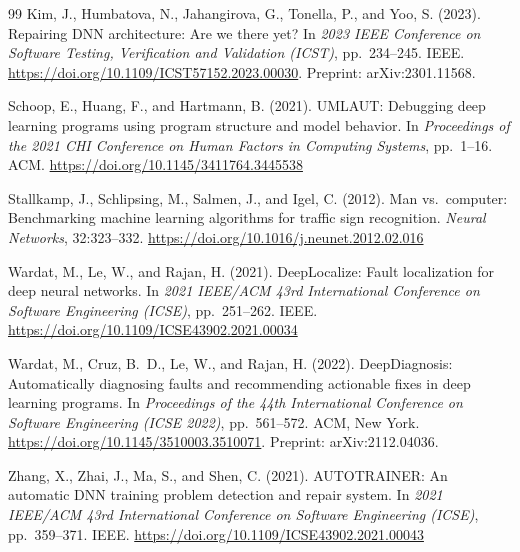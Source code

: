 \documentclass[11pt]{article}
\begin{document}
\begin{thebibliography}{99}
Kim, J., Humbatova, N., Jahangirova, G., Tonella, P., and Yoo, S. (2023).
\newblock Repairing DNN architecture: Are we there yet?
\newblock In \emph{2023 IEEE Conference on Software Testing, Verification and Validation (ICST)}, pp.~234--245. IEEE.
\newblock \url{https://doi.org/10.1109/ICST57152.2023.00030}. Preprint: arXiv:2301.11568.

Schoop, E., Huang, F., and Hartmann, B. (2021).
\newblock UMLAUT: Debugging deep learning programs using program structure and model behavior.
\newblock In \emph{Proceedings of the 2021 CHI Conference on Human Factors in Computing Systems}, pp.~1--16. ACM.
\newblock \url{https://doi.org/10.1145/3411764.3445538}

Stallkamp, J., Schlipsing, M., Salmen, J., and Igel, C. (2012).
\newblock Man vs.\ computer: Benchmarking machine learning algorithms for traffic sign recognition.
\newblock \emph{Neural Networks}, 32:323--332.
\newblock \url{https://doi.org/10.1016/j.neunet.2012.02.016}

Wardat, M., Le, W., and Rajan, H. (2021).
\newblock DeepLocalize: Fault localization for deep neural networks.
\newblock In \emph{2021 IEEE/ACM 43rd International Conference on Software Engineering (ICSE)}, pp.~251--262. IEEE.
\newblock \url{https://doi.org/10.1109/ICSE43902.2021.00034}

Wardat, M., Cruz, B.~D., Le, W., and Rajan, H. (2022).
\newblock DeepDiagnosis: Automatically diagnosing faults and recommending actionable fixes in deep learning programs.
\newblock In \emph{Proceedings of the 44th International Conference on Software Engineering (ICSE 2022)}, pp.~561--572. ACM, New York.
\newblock \url{https://doi.org/10.1145/3510003.3510071}. Preprint: arXiv:2112.04036.

Zhang, X., Zhai, J., Ma, S., and Shen, C. (2021).
\newblock AUTOTRAINER: An automatic DNN training problem detection and repair system.
\newblock In \emph{2021 IEEE/ACM 43rd International Conference on Software Engineering (ICSE)}, pp.~359--371. IEEE.
\newblock \url{https://doi.org/10.1109/ICSE43902.2021.00043}

\end{thebibliography}
\end{document}
